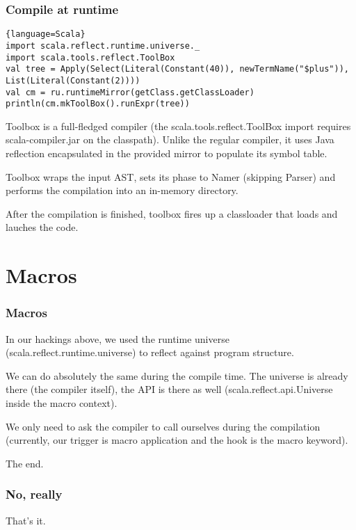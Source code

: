 \documentclass[hyperref={bookmarks=false}]{beamer}
\begin{document}
\begin{frame}[fragile]
\frametitle{Compile at runtime}

\begin{lstlisting}{language=Scala}
import scala.reflect.runtime.universe._
import scala.tools.reflect.ToolBox
val tree = Apply(Select(Literal(Constant(40)), newTermName("$plus")), List(Literal(Constant(2))))
val cm = ru.runtimeMirror(getClass.getClassLoader)
println(cm.mkToolBox().runExpr(tree))
\end{lstlisting}

Toolbox is a full-fledged compiler (the scala.tools.reflect.ToolBox import requires scala-compiler.jar on the classpath). Unlike the regular compiler, it uses Java reflection encapsulated in the provided mirror to populate its symbol table.

Toolbox wraps the input AST, sets its phase to Namer (skipping Parser) and performs the compilation into an in-memory directory.

After the compilation is finished, toolbox fires up a classloader that loads and lauches the code.

\end{frame}

\section{Macros}

\begin{frame}[fragile]
\frametitle{Macros}

In our hackings above, we used the runtime universe (scala.reflect.runtime.universe) to reflect against program structure.

We can do absolutely the same during the compile time.
The universe is already there (the compiler itself), the API is there as well
(scala.reflect.api.Universe inside the macro context).

We only need to ask the compiler to call ourselves during the compilation
(currently, our trigger is macro application and the hook is the macro keyword).

The end.

\end{frame}

\begin{frame}[fragile]
\frametitle{No, really}

That's it.

\end{frame}
\end{document}

